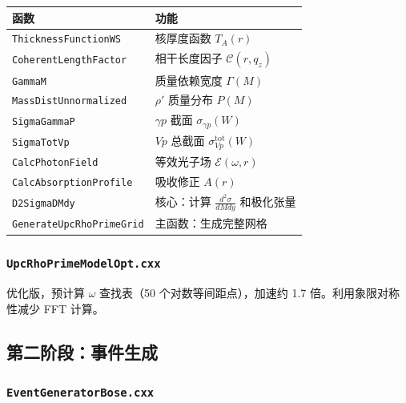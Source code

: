 \documentclass[11pt,a4paper,UTF8]{ctexart}
\begin{document}
\begin{longtable}{l p{8cm}}
\toprule
\textbf{函数} & \textbf{功能} \\
\midrule
\texttt{ThicknessFunctionWS} & 核厚度函数 $T_A(r)$ \\
\texttt{CoherentLengthFactor} & 相干长度因子 $\mathcal{C}(r,q_z)$ \\
\texttt{GammaM} & 质量依赖宽度 $\Gamma(M)$ \\
\texttt{MassDistUnnormalized} & $\rho'$ 质量分布 $P(M)$ \\
\texttt{SigmaGammaP} & $\gamma p$ 截面 $\sigma_{\gamma p}(W)$ \\
\texttt{SigmaTotVp} & $Vp$ 总截面 $\sigma_{Vp}^{\text{tot}}(W)$ \\
\texttt{CalcPhotonField} & 等效光子场 $\mathcal{E}(\omega,r)$ \\
\texttt{CalcAbsorptionProfile} & 吸收修正 $A(r)$ \\
\texttt{D2SigmaDMdy} & 核心：计算 $\frac{d^2\sigma}{dM dy}$ 和极化张量 \\
\texttt{GenerateUpcRhoPrimeGrid} & 主函数：生成完整网格 \\
\bottomrule
\end{longtable}

\subsubsection{\texttt{UpcRhoPrimeModelOpt.cxx}}

优化版，预计算 $\omega$ 查找表（50 个对数等间距点），加速约 1.7 倍。利用象限对称性减少 FFT 计算。

\subsection{第二阶段：事件生成}

\subsubsection{\texttt{EventGeneratorBose.cxx}}
\end{document}

